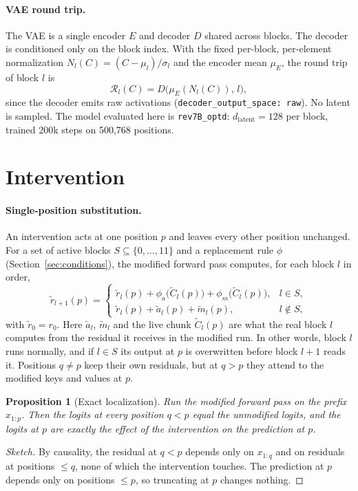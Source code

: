 \documentclass[11pt]{article}
\newcommand{\RT}{\mathcal{R}}
\newtheorem{proposition}{Proposition}
\begin{document}
\paragraph{VAE round trip.} The VAE is a single encoder $E$ and decoder $D$ shared across blocks. The decoder is
conditioned only on the block index. With the fixed per-block, per-element normalization
$N_l(C) = (C - \mu_l)/\sigma_l$ and the encoder mean $\mu_E$, the round trip of block $l$ is
\begin{equation}
  \RT_l(C) = D\big(\mu_E(N_l(C)),\, l\big),
\end{equation}
since the decoder emits raw activations (\texttt{decoder\_output\_space: raw}). No latent is sampled. The model evaluated
here is \texttt{rev7B\_optd}: $d_{\text{latent}} = 128$ per block, trained 200k steps on 500{,}768 positions.

\section{Intervention}

\paragraph{Single-position substitution.} An intervention acts at one position $p$ and leaves every other position
unchanged. For a set of active blocks $S \subseteq \{0,\dots,11\}$ and a replacement rule $\phi$ (Section~\ref{sec:conditions}),
the modified forward pass computes, for each block $l$ in order,
\begin{equation}
  \tilde r_{l+1}(p) =
  \begin{cases}
    \tilde r_l(p) + \phi_a\big(\tilde C_l(p)\big) + \phi_m\big(\tilde C_l(p)\big), & l \in S,\\[2pt]
    \tilde r_l(p) + \tilde a_l(p) + \tilde m_l(p), & l \notin S,
  \end{cases}
\end{equation}
with $\tilde r_0 = r_0$. Here $\tilde a_l$, $\tilde m_l$ and the live chunk $\tilde C_l(p)$ are what the real block $l$
computes from the residual it receives in the modified run. In other words, block $l$ runs normally, and if $l \in S$ its
output at $p$ is overwritten before block $l+1$ reads it. Positions $q \neq p$ keep their own residuals, but at $q > p$ they
attend to the modified keys and values at $p$.

\begin{proposition}[Exact localization]
Run the modified forward pass on the prefix $x_{1:p}$. Then the logits at every position $q < p$ equal the unmodified
logits, and the logits at $p$ are exactly the effect of the intervention on the prediction at $p$.
\end{proposition}
\begin{proof}[Sketch]
By causality, the residual at $q < p$ depends only on $x_{1:q}$ and on residuals at positions $\le q$, none of which the
intervention touches. The prediction at $p$ depends only on positions $\le p$, so truncating at $p$ changes nothing.
\end{proof}
\end{document}
